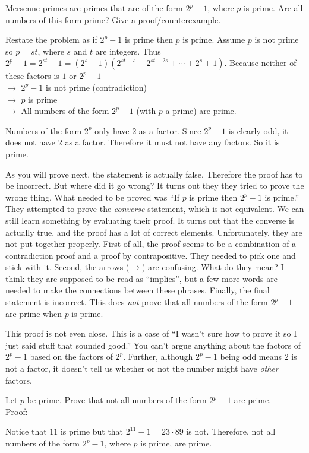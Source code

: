 \begin{eval}
Mersenne primes are primes that are of the form $2^p-1$, where $p$ is prime.
Are all numbers of this form prime?  Give a proof/counterexample.
\begin{spfenum}
\item
Restate the problem as if $2^p-1$ is prime then $p$ is prime.
Assume $p$ is not prime so $p=s t$, where $s$ and $t$ are integers.
Thus $2^p-1=2^{st}-1=(2^s-1)(2^{st-s}+2^{st-2s}+\cdots+2^s+1)$.
Because neither of these factors is $1$ or $2^p-1$\\
$\rightarrow$ $2^p-1$ is not prime (contradiction)\\
$\rightarrow$ $p$ is prime\\
$\rightarrow$ All numbers of the form $2^p-1$ (with $p$ a prime) are prime.\\
\evallinethree
\item
Numbers of the form $2^p$ only have $2$ as a factor.  Since $2^p-1$ is clearly odd, it does
not have $2$ as a factor.  Therefore it must not have any factors.  So it is prime.\\
\evallinetwo
\end{spfenum}
\begin{answer}
\begin{pfevalenum}
\item
As you will prove next, the statement is actually false.
Therefore the proof has to be incorrect.
But where did it go wrong?
It turns out they they tried to prove the wrong thing.  What needed to be proved was
``If $p$ is prime then $2^p-1$ is prime.''  They attempted to prove the {\em converse}
statement, which is not equivalent.  
We can still learn something by evaluating their proof.
It turns out that the converse is actually true, 
and the proof has a lot of correct elements.  Unfortunately, they are not put together
properly.   First of all, the proof seems to be a combination of a contradiction proof
and a proof by contrapositive.  They needed to pick one and stick with it.
Second, the arrows ($\rightarrow$) are confusing.  What do they mean?
I think they are supposed to be read as ``implies'', but a few more words are needed to
make the connections between these phrases.
Finally, the final statement is incorrect.  This does {\em not} prove that all
numbers of the form $2^p-1$ are prime when $p$ is prime.
\item
This proof is not even close.  
This is a case of ``I wasn't sure how to prove it so I just said stuff that sounded good.''
You can't argue anything about the factors of 
$2^p-1$ based on the factors of $2^p$.  Further, although $2^p-1$ being odd means
$2$ is not a factor, it doesn't tell us whether or not the number might have
{\em other} factors.
\end{pfevalenum}
\end{answer}
\end{eval}

\begin{exer}
Let $p$ be prime.  Prove that not all numbers of the form $2^p-1$ are prime.\\
Proof:
\vspace*{2in}
\begin{answer}
Notice that $11$ is prime but that $2^{11}-1=23\cdot 89$ is not.
Therefore, not all numbers of the form $2^p-1$, where $p$ is prime, are prime. 
\end{answer}
\end{exer}

